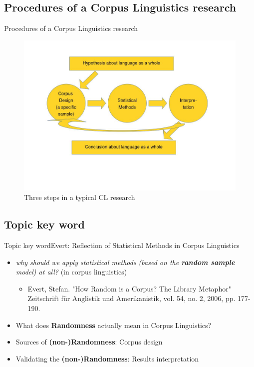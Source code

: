 \subsection{Procedures of a Corpus Linguistics research}
\begin{frame}{Procedures of a Corpus Linguistics research}
	\begin{figure}
		\includegraphics[width=.7\textwidth]{Figures/Procedures.jpg}
		\caption{Three steps in a typical CL research}
	\end{figure}
\end{frame}


\subsection{Topic key word}
\begin{frame}[t]{Topic key word}{Evert: Reflection of Statistical Methods in Corpus Linguistics}
	
	\begin{itemize}
		\item \textit{why should we apply statistical methods (based on the \textbf{random sample} model) at all?} (in corpus linguistics)
		\begin{itemize}
			\item Evert, Stefan. "How Random is a Corpus? The Library Metaphor" Zeitschrift für Anglistik und Amerikanistik, vol. 54, no. 2, 2006, pp. 177-190.
		\end{itemize}
		\bigbreak
		\item What does \textbf{Randomness} actually mean in Corpus Linguistics?
		\bigbreak
		
		\item Sources of \textbf{(non-)Randomness}: Corpus design
		\bigbreak
		
		\item Validating the \textbf{(non-)Randomness}: Results interpretation 
	\end{itemize}
	
\end{frame}


